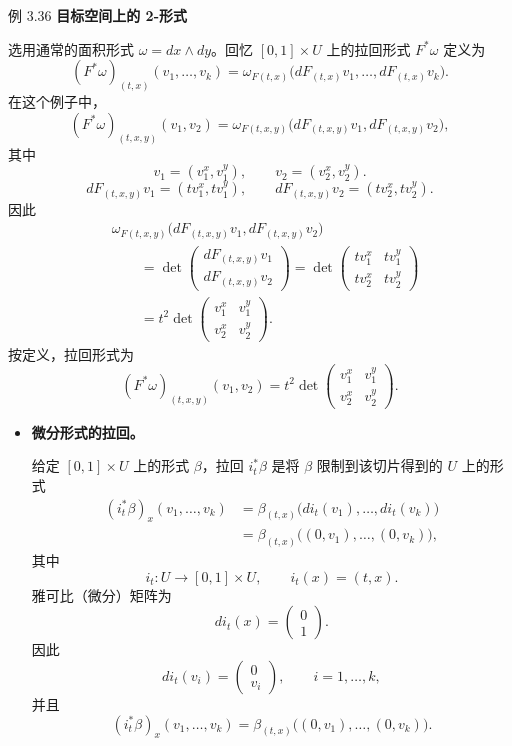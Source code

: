 \begin{statement}{例 3.36}{}
\noindent\textbf{目标空间上的 2-形式}\par
选用通常的面积形式 $\omega=dx\wedge dy$。回忆 $[0,1]\times U$ 上的拉回形式 $F^*\omega$ 定义为
\[
  (F^*\omega)_{(t,x)}(v_1,\dots,v_k)
    =\omega_{F(t,x)}\bigl(dF_{(t,x)}v_1,\dots,dF_{(t,x)}v_k\bigr).
\]
在这个例子中，
\[
  (F^*\omega)_{(t,x,y)}(v_1,v_2)
    =\omega_{F(t,x,y)}\bigl(dF_{(t,x,y)}v_1,dF_{(t,x,y)}v_2\bigr),
\]
其中
\[
  v_1=(v_1^x,v_1^y),\qquad v_2=(v_2^x,v_2^y).
\]
\[
  dF_{(t,x,y)}v_1=(tv_1^x,tv_1^y),\qquad
  dF_{(t,x,y)}v_2=(tv_2^x,tv_2^y).
\]
因此
\begin{align*}
 &\omega_{F(t,x,y)}\bigl(dF_{(t,x,y)}v_1,dF_{(t,x,y)}v_2\bigr)\\
 &\qquad=\det\begin{pmatrix}dF_{(t,x,y)}v_1\\ dF_{(t,x,y)}v_2\end{pmatrix}
   =\det\begin{pmatrix}tv_1^x&tv_1^y\\tv_2^x&tv_2^y\end{pmatrix}\\
 &\qquad=t^2\det\begin{pmatrix}v_1^x&v_1^y\\v_2^x&v_2^y\end{pmatrix}.
\end{align*}
按定义，拉回形式为%
%
\[
  (F^*\omega)_{(t,x,y)}(v_1,v_2)
   =t^2\det\begin{pmatrix}v_1^x&v_1^y\\v_2^x&v_2^y\end{pmatrix}.
\]

\begin{itemize}
\item \textbf{微分形式的拉回。}

给定 $[0,1]\times U$ 上的形式 $\beta$，拉回 $i_t^*\beta$ 是将 $\beta$ 限制到该切片得到的 $U$ 上的形式
\begin{align*}
  (i_t^*\beta)_x(v_1,\dots,v_k)
    &=\beta_{(t,x)}\bigl(di_t(v_1),\dots,di_t(v_k)\bigr)\\
    &=\beta_{(t,x)}\bigl((0,v_1),\dots,(0,v_k)\bigr),
\end{align*}
其中
\[
  i_t\colon U\to[0,1]\times U,\qquad i_t(x)=(t,x).
\]
雅可比（微分）矩阵为
\[
  di_t(x)=\begin{pmatrix}0\\1\end{pmatrix}.
\]
因此
\[
  di_t(v_i)=\begin{pmatrix}0\\v_i\end{pmatrix},\qquad i=1,\dots,k,
\]
并且
\[
  (i_t^*\beta)_x(v_1,\dots,v_k)=\beta_{(t,x)}\bigl((0,v_1),\dots,(0,v_k)\bigr).
\]


\end{itemize}
\end{statement}
